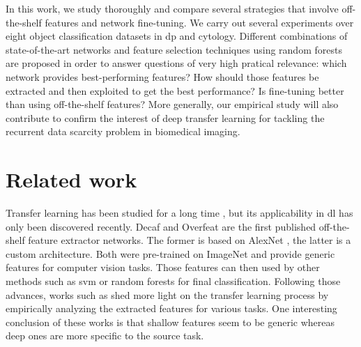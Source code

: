In this work, we study thoroughly and compare several strategies that involve off-the-shelf features and network fine-tuning. We carry out several experiments over eight object classification datasets in \acrshort{dp} and cytology. Different combinations of state-of-the-art networks and feature selection techniques using random forests are proposed in order to answer questions of very high pratical relevance: which network provides best-performing features? How should those features be extracted and then exploited to get the best performance? Is fine-tuning better than using off-the-shelf features? More generally, our empirical study will also contribute to confirm the interest of deep transfer learning for tackling the recurrent data scarcity problem in biomedical imaging.





\section{Related work}

Transfer learning has been studied for a long time \parencite{pan2010survey}, but its applicability in \acrshort{dl} has only been discovered recently. Decaf \parencite{donahue2014decaf} and Overfeat \parencite{razavian2014cnn,sermanet2013overfeat} are the first published off-the-shelf feature extractor networks. The former is based on AlexNet \parencite{krizhevsky2012imagenet}, the latter is a custom architecture. Both were pre-trained on ImageNet and provide generic features for computer vision tasks. Those features can then used by other methods such as \acrshort{svm} \parencite{fan2008liblinear} or random forests \parencite{breiman2001random} for final classification. Following those advances, works such as \parencite{yosinski2014transferable,zeiler2014visualizing} shed more light on the transfer learning process by empirically analyzing the extracted features for various tasks. One interesting conclusion of these works is that shallow features seem to be generic whereas deep ones are more specific to the source task.

